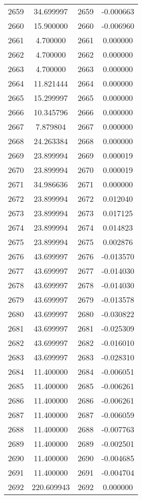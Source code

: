 \documentclass[12pt]{article}
\begin{document}
\begin{longtable}{@{}cccc@{}}
2659 & 34.699997 & 2659 & -0.000663 \\
2660 & 15.900000 & 2660 & -0.006960 \\
2661 & 4.700000 & 2661 & 0.000000 \\
2662 & 4.700000 & 2662 & 0.000000 \\
2663 & 4.700000 & 2663 & 0.000000 \\
2664 & 11.821444 & 2664 & 0.000000 \\
2665 & 15.299997 & 2665 & 0.000000 \\
2666 & 10.345796 & 2666 & 0.000000 \\
2667 & 7.879804 & 2667 & 0.000000 \\
2668 & 24.263384 & 2668 & 0.000000 \\
2669 & 23.899994 & 2669 & 0.000019 \\
2670 & 23.899994 & 2670 & 0.000019 \\
2671 & 34.986636 & 2671 & 0.000000 \\
2672 & 23.899994 & 2672 & 0.012040 \\
2673 & 23.899994 & 2673 & 0.017125 \\
2674 & 23.899994 & 2674 & 0.014823 \\
2675 & 23.899994 & 2675 & 0.002876 \\
2676 & 43.699997 & 2676 & -0.013570 \\
2677 & 43.699997 & 2677 & -0.014030 \\
2678 & 43.699997 & 2678 & -0.014030 \\
2679 & 43.699997 & 2679 & -0.013578 \\
2680 & 43.699997 & 2680 & -0.030822 \\
2681 & 43.699997 & 2681 & -0.025309 \\
2682 & 43.699997 & 2682 & -0.016010 \\
2683 & 43.699997 & 2683 & -0.028310 \\
2684 & 11.400000 & 2684 & -0.006051 \\
2685 & 11.400000 & 2685 & -0.006261 \\
2686 & 11.400000 & 2686 & -0.006261 \\
2687 & 11.400000 & 2687 & -0.006059 \\
2688 & 11.400000 & 2688 & -0.007763 \\
2689 & 11.400000 & 2689 & -0.002501 \\
2690 & 11.400000 & 2690 & -0.004685 \\
2691 & 11.400000 & 2691 & -0.004704 \\
2692 & 220.609943 & 2692 & 0.000000 \\

\end{longtable}
\end{document}
